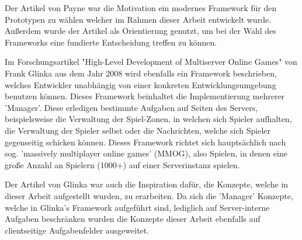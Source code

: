 Der Artikel von Payne war die Motivation ein modernes Framework für den Prototypen zu wählen welcher im Rahmen dieser Arbeit entwickelt wurde. Außerdem wurde der Artikel als Orientierung genutzt, um bei der Wahl des Frameworks eine fundierte Entscheidung treffen zu können.

Im Forschungsartikel "High-Level Development of Multiserver Online Games" von Frank Glinka aus dem Jahr 2008 \cite{Glinka.2008} wird ebenfalls ein Framework beschrieben, welches Entwickler unabhängig von einer konkreten Entwicklungsumgebung benutzen können. Dieses Framework beinhaltet die Implementierung mehrerer 'Manager'. Diese erledigen bestimmte Aufgaben auf Seiten des Servers, beispielsweise die Verwaltung der Spiel-Zonen, in welchen sich Spieler aufhalten, die Verwaltung der Spieler selbst oder die Nachrichten, welche sich Spieler gegenseitig schicken können. Dieses Framework richtet sich hauptsächlich nach sog. 'massively multiplayer online games' (MMOG), also Spielen, in denen eine große Anzahl an Spielern (1000+) auf einer Serverinstanz spielen.

Der Artikel von Glinka war auch die Inspiration dafür, die Konzepte, welche in dieser Arbeit aufgestellt wurden, zu erarbeiten. Da sich die 'Manager' Konzepte, welche in Glinka's Framework aufgeführt sind, lediglich auf Server-interne Aufgaben beschränken wurden die Konzepte dieser Arbeit ebenfalls auf clientseitige Aufgabenfelder ausgeweitet.